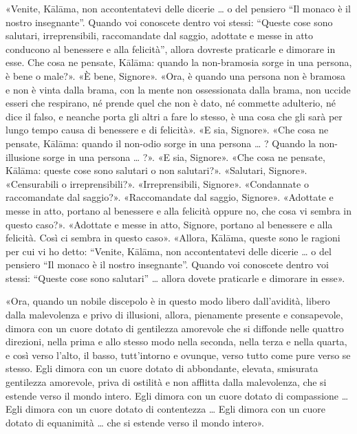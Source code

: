 «Venite, Kālāma, non accontentatevi delle dicerie … o del pensiero “Il monaco è
il nostro insegnante”. Quando voi conoscete dentro voi stessi: “Queste cose sono
salutari, irreprensibili, raccomandate dal saggio, adottate e messe in atto
conducono al benessere e alla felicità”, allora dovreste praticarle e dimorare
in esse. Che cosa ne pensate, Kālāma: quando la non-bramosia sorge in una
persona, è bene o male?». «È bene, Signore». «Ora, è quando una persona non è
bramosa e non è vinta dalla brama, con la mente non ossessionata dalla brama,
non uccide esseri che respirano, né prende quel che non è dato, né commette
adulterio, né dice il falso, e neanche porta gli altri a fare lo stesso, è una
cosa che gli sarà per lungo tempo causa di benessere e di felicità». «E sia,
Signore». «Che cosa ne pensate, Kālāma: quando il non-odio sorge in una persona
… ? Quando la non-illusione sorge in una persona … ?». «E sia, Signore». «Che
cosa ne pensate, Kālāma: queste cose sono salutari o non salutari?». «Salutari,
Signore». «Censurabili o irreprensibili?». «Irreprensibili, Signore».
«Condannate o raccomandate dal saggio?». «Raccomandate dal saggio, Signore».
«Adottate e messe in atto, portano al benessere e alla felicità oppure no, che
cosa vi sembra in questo caso?». «Adottate e messe in atto, Signore, portano al
benessere e alla felicità. Così ci sembra in questo caso». «Allora, Kālāma,
queste sono le ragioni per cui vi ho detto: “Venite, Kālāma, non accontentatevi
delle dicerie … o del pensiero “Il monaco è il nostro insegnante”. Quando voi
conoscete dentro voi stessi: “Queste cose sono salutari” … allora dovete
praticarle e dimorare in esse».

«Ora, quando un nobile discepolo è in questo modo libero dall’avidità, libero
dalla malevolenza e privo di illusioni, allora, pienamente presente e
consapevole, dimora con un cuore dotato di gentilezza amorevole che si diffonde
nelle quattro direzioni, nella prima e allo stesso modo nella seconda, nella
terza e nella quarta, e così verso l’alto, il basso, tutt’intorno e ovunque,
verso tutto come pure verso se stesso. Egli dimora con un cuore dotato di
abbondante, elevata, smisurata gentilezza amorevole, priva di ostilità e non
afflitta dalla malevolenza, che si estende verso il mondo intero. Egli dimora
con un cuore dotato di compassione … Egli dimora con un cuore dotato di
contentezza … Egli dimora con un cuore dotato di equanimità … che si estende
verso il mondo intero».

